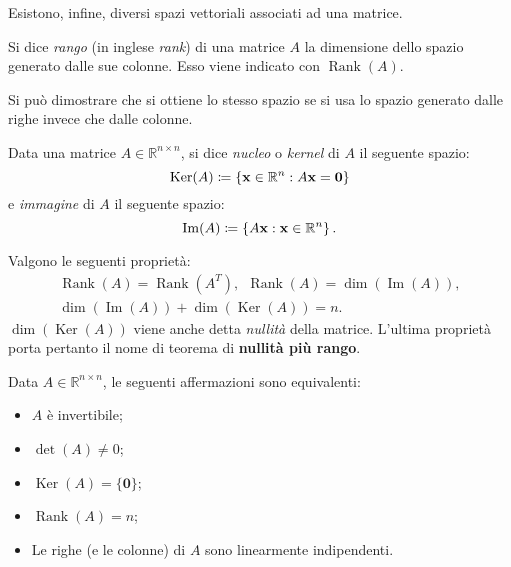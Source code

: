 Esistono, infine, diversi spazi vettoriali associati ad una matrice.
\begin{definition}
	[Rango]
	Si dice \textit{rango} (in inglese \textit{rank}) di una matrice $A$ la dimensione dello spazio generato dalle sue colonne.
  Esso viene indicato con $\operatorname{Rank}( A)$.
\end{definition}
Si può dimostrare che si ottiene lo stesso spazio se si usa lo spazio generato dalle righe invece che dalle colonne.
\begin{definition}
	Data una matrice $A \in \mathbb{R}^{n \times n}$, si dice \textit{nucleo} o \textit{kernel} di $A$ il seguente spazio:
	\begin{equation*}
		\operatorname{Ker}( A) \coloneqq \left\{\mathbf{x} \in \mathbb{R}^{n} :A\mathbf{x} =\mathbf{0}\right\}
	\end{equation*}
  e \textit{immagine} di $A$ il seguente spazio:
  \begin{equation*}
    \operatorname{Im}( A) \coloneqq \left\{A\mathbf{x} :\mathbf{x} \in \mathbb{R}^{n}\right\} .
  \end{equation*}
\end{definition}
\begin{theorem}
	Valgono le seguenti proprietà:
	\begin{gather*}
		\operatorname{Rank}( A) =\operatorname{Rank}\left( A^{T}\right) ,\ \ \operatorname{Rank}( A) =\operatorname{dim}(\operatorname{Im}( A)) ,\\
		\operatorname{dim}(\operatorname{Im}( A)) +\operatorname{dim}(\operatorname{Ker}( A)) =n.
	\end{gather*}
  $\operatorname{dim}(\operatorname{Ker}( A))$ viene anche detta \textit{nullità} della matrice.
  L'ultima proprietà porta pertanto il nome di teorema di \textbf{nullità più rango}.
\end{theorem}
\begin{theorem}
	Data $A\in \mathbb{R}^{n\times n}$, le seguenti affermazioni sono equivalenti:
\begin{itemize}
	\item $A$ è invertibile;
	\item $\operatorname{det}( A) \neq 0$;
	\item $\operatorname{Ker}( A) =\{\mathbf{0}\}$;
	\item $\operatorname{Rank}( A) =n$;
	\item Le righe (e le colonne) di $A$ sono linearmente indipendenti.
\end{itemize}
\end{theorem}

